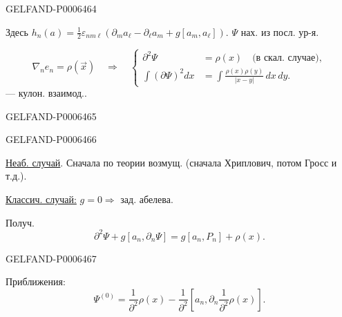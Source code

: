\begin{GelfandAdjacentEvidence}{GELFAND-P000646}{4}


Здесь \(h_n(a)=\frac12\varepsilon_{nm\ell}(\partial_m a_\ell-\partial_\ell a_m+g[a_m,a_\ell])\).
\(\Psi\) нах. из посл. ур-я.

\[
\nabla_n e_n=\rho(\vec x)\quad\Rightarrow\quad
\left\{\begin{aligned}
\partial^2\Psi&=\rho(x)\quad\text{(в скал. случае)},\\
\int(\partial\Psi)^2dx&=\int\frac{\rho(x)\rho(y)}{|x-y|}\,dx\,dy.
\end{aligned}\right.
\]
--- кулон. взаимод..
\end{GelfandAdjacentEvidence}
\begin{GelfandAdjacentEvidence}{GELFAND-P000646}{5}

\end{GelfandAdjacentEvidence}
\begin{GelfandAdjacentEvidence}{GELFAND-P000646}{6}


\underline{Неаб. случай}. Сначала по теории возмущ. (сначала Хриплович, потом Гросс и т.д.).

\underline{Классич. случай:} \(g=0\Rightarrow\) зад. абелева.

Получ.
\[
\partial^2\Psi+g[a_n,\partial_n\Psi]=g[a_n,P_n]+\rho(x).
\]
\end{GelfandAdjacentEvidence}
\begin{GelfandAdjacentEvidence}{GELFAND-P000646}{7}


Приближения:
\[
\Psi^{(0)}=\frac1{\partial^2}\rho(x)
-\frac1{\partial^2}\left[a_n,\partial_n\frac1{\partial^2}\rho(x)\right].
\]
\end{GelfandAdjacentEvidence}
